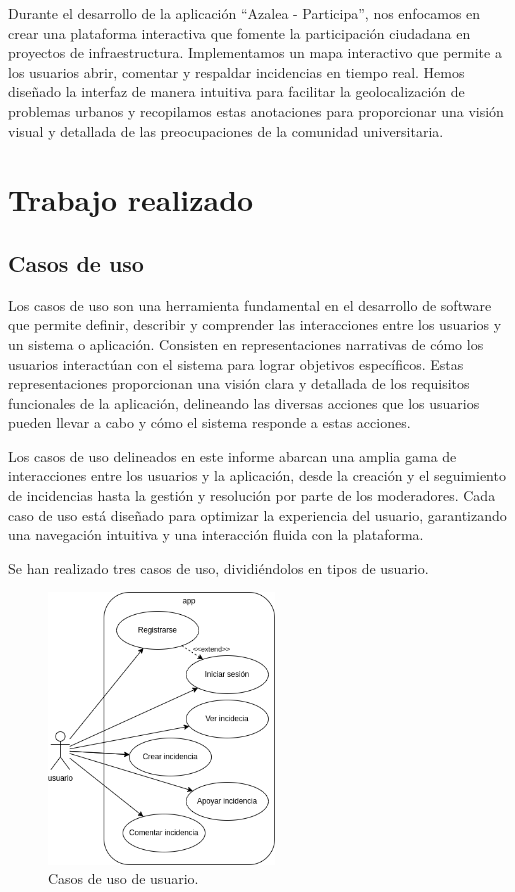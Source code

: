 \documentclass{article}
\begin{document}
Durante el desarrollo de la aplicación ``Azalea - Participa'', nos enfocamos en crear una plataforma interactiva que fomente la participación ciudadana en proyectos de infraestructura. Implementamos un mapa interactivo que permite a los usuarios abrir, comentar y respaldar incidencias en tiempo real. Hemos diseñado la interfaz de manera intuitiva para facilitar la geolocalización de problemas urbanos y recopilamos estas anotaciones para proporcionar una visión visual y detallada de las preocupaciones de la comunidad universitaria.

\newpage

\section{Trabajo realizado}



\subsection{Casos de uso}

Los casos de uso son una herramienta fundamental en el desarrollo de software que permite definir, describir y comprender las interacciones entre los usuarios y un sistema o aplicación. Consisten en representaciones narrativas de cómo los usuarios interactúan con el sistema para lograr objetivos específicos. Estas representaciones proporcionan una visión clara y detallada de los requisitos funcionales de la aplicación, delineando las diversas acciones que los usuarios pueden llevar a cabo y cómo el sistema responde a estas acciones.

Los casos de uso delineados en este informe abarcan una amplia gama de interacciones entre los usuarios y la aplicación, desde la creación y el seguimiento de incidencias hasta la gestión y resolución por parte de los moderadores. Cada caso de uso está diseñado para optimizar la experiencia del usuario, garantizando una navegación intuitiva y una interacción fluida con la plataforma.

Se han realizado tres casos de uso, dividiéndolos en tipos de usuario.

\begin{figure}[H]
    \center
    \includegraphics[width=6cm]{images/caso_de_uso_usuario.png}
    \caption{Casos de uso de usuario.}
    \label{fig:caso_uso_usuario}
\end{figure}
\end{document}
